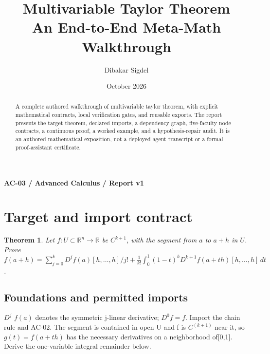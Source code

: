 \documentclass[preprint,12pt,aps,pra,showkeys,amsmath,amssymb,superscriptaddress,floatfix]{revtex4-2}
\newtheorem{theorem}{Theorem}[section]
\theoremstyle{definition}
\theoremstyle{remark}
\begin{document}
\title{Multivariable Taylor Theorem\\[4pt]\large An End-to-End Meta-Math Walkthrough}

\author{Dibakar Sigdel}


\date{October 2026}

\begin{abstract}

A complete authored walkthrough of multivariable taylor theorem, with
explicit mathematical contracts, local verification gates, and reusable
exports. The report presents the target theorem, declared imports, a
dependency graph, five-faculty node contracts, a continuous proof, a
worked example, and a hypothesis-repair audit. It is an authored
mathematical exposition, not a deployed-agent transcript or a formal
proof-assistant certificate.

\end{abstract}\maketitle\linespread{1.12}\selectfont

\noindent\textbf{AC-03 / Advanced Calculus / Report v1}

\section{Target and import contract}

\begin{theorem}

Let \(f:U\subset\mathbb R^n\to\mathbb R\) be \(C^{k+1}\), with the
segment from \(a\) to \(a+h\) in \(U\). Prove
\(f(a+h)=\sum_{j=0}^k D^jf(a)[h,\ldots,h]/j!+\frac1{k!}\int_0^1(1-t)^kD^{k+1}f(a+th)[h,\ldots,h]\,dt\).

\end{theorem}

\subsection{Foundations and permitted imports}

\(D^j\) \(f(a)\) denotes the symmetric j-linear derivative; \(D^0f=f\).
Import the chain rule and AC-02. The segment is contained in open U and
f is \(C^{(k+1)}\) near it, so \(g(t)=f(a+th)\) has the necessary
derivatives on a neighborhood of{[}0,1{]}. Derive the one-variable
integral remainder below.
\end{document}
